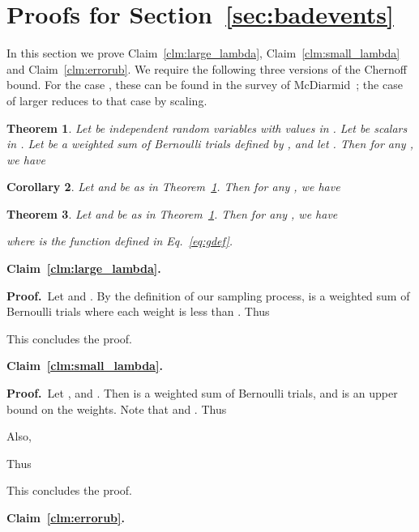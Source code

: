 \documentclass[11pt]{article}
\newcommand{\proofbelow}{8pt}
\numberwithin{equation}{section}
\newtheorem{theorem}{Theorem}[section]
\newtheorem{corollary}[theorem]{Corollary}
\renewenvironment{proof}{\noindent\textbf{Proof.}\,}{\afterproof}
\newcommand{\afterproof}{\hfill  \par \vspace{\proofbelow}}
\newcommand{\repeatclaim}[2]{\vspace{6pt}\noindent\textbf{#1. }{\it #2} \vspace{6pt}}
\newcommand{\AppendixName}[1]{\label{app:#1}}
\newcommand{\Claim}[1]{Claim~\ref{clm:#1}}
\newcommand{\CorollaryName}[1]{\label{cor:#1}}
\newcommand{\Equation}[1]{Eq.~\eqref{eq:#1}}
\newcommand{\Section}[1]{Section~\ref{sec:#1}}
\newcommand{\TheoremName}[1]{\label{thm:#1}}
\newcommand{\Theorem}[1]{Theorem~\ref{thm:#1}}
\begin{document}
\section{Proofs for \Section{badevents}}
\AppendixName{boundproofs}

In this section we prove \Claim{large_lambda}, \Claim{small_lambda} and \Claim{errorub}.
We require the following three versions of the Chernoff bound.
For the case , these can be found in the survey of McDiarmid~\cite{McDiarmid};
the case of larger  reduces to that case by scaling.

\begin{theorem}
\TheoremName{chernoff_3}
Let  be independent random variables with values in .
Let  be scalars in .
Let  be a weighted sum of Bernoulli trials defined by
, and let .
Then for any , we have

\end{theorem}


\begin{corollary}
\CorollaryName{chernoff_1}
Let  and  be as in \Theorem{chernoff_3}.
Then for any , we have

\end{corollary}

\begin{theorem}
\TheoremName{chernoff_4}
Let  and  be as in \Theorem{chernoff_3}.
Then for any , we have

where  is the function defined in \Equation{gdef}.
\end{theorem}


\repeatclaim{\Claim{large_lambda}}{\clmlargelambda}

\begin{proof}
Let  and .
By the definition of our sampling process,
 is a weighted sum of Bernoulli trials where each weight is less than .
Thus

This concludes the proof.
\end{proof}

\repeatclaim{\Claim{small_lambda}}{\clmsmalllambda}

\begin{proof}
Let , 
and .
Then  is a weighted sum of Bernoulli trials, and  is an upper bound on the weights.
Note that  and .
Thus

Also, 

Thus

This concludes the proof.
\end{proof}


\repeatclaim{\Claim{errorub}}{\clmerrorub}
\end{document}
